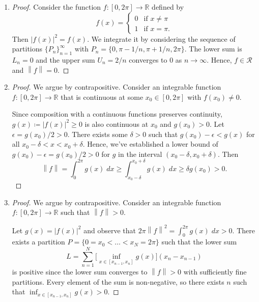 \documentclass[oneside]{article}
\newcommand\abs[1]{\left|#1\right|}
\newcommand\norm[1]{\left\|#1\right\|}
\newcommand\bbR{\mathbb{R}}
\newcommand\calR{\mathcal{R}}
\begin{document}
  \begin{enumerate}[label=(\alph*)]
    \item
      \begin{proof}
        Consider the function $f : [0, 2\pi] \to \bbR$ defined by \[
            f(x) = \begin{cases}
              0 &\text{if }x \neq \pi \\
              1 &\text{if }x = \pi \text{.}
            \end{cases}
        \] Then $\abs{f(x)}^2 = f(x)$. We integrate it by considering the sequence of partitions $\{P_n\}_{n=1}^\infty$ with $P_n = \{0, \pi - 1/n, \pi + 1/n, 2\pi\}$. The lower sum is $L_n = 0$ and the upper sum $U_n = 2/n$ converges to $0$ as $n\to\infty$. Hence, $f \in \calR$ and $\norm{f} = 0$.
      \end{proof}

    \item
      \begin{proof}
        We argue by contrapositive. Consider an integrable function $f : [0, 2\pi] \to \bbR$ that is continuous at some $x_0 \in [0, 2\pi]$ with $f(x_0) \neq 0$.

        Since composition with a continuous functions preserves continuity, $g(x) \coloneqq \abs{f(x)}^2 \geq 0$ is also continuous at $x_0$ and $g(x_0) > 0$. Let $\epsilon = g(x_0) / 2 > 0$. There exists some $\delta > 0$ such that $g(x_0) - \epsilon < g(x)$ for all $x_0 - \delta < x < x_0 + \delta$. Hence, we've established a lower bound of $g(x_0) - \epsilon = g(x_0) / 2 > 0$ for $g$ in the interval $(x_0 - \delta, x_0 + \delta)$. Then \[
          \norm{f}
          = \int_0^{2\pi} g(x)\; dx
          \geq \int_{x_0 - \delta}^{x_0 + \delta} g(x)\; dx
          \geq \delta g(x_0)
          > 0 \text{.}
        \]
      \end{proof}

    \item
      \begin{proof}
        We argue by contrapositive. Consider an integrable function $f : [0, 2\pi] \to \bbR$ such that $\norm{f} > 0$.

        Let $g(x) = \abs{f(x)}^2$ and observe that $2\pi\norm{f}^2 = \int_0^{2\pi}g(x)\;dx > 0$. There exists a partition $P = \{0 = x_0 < \dots < x_N = 2\pi\}$ such that the lower sum \[
          L = \sum_{n=1}^N \big[ \inf_{x \in [x_{n-1}, x_n]} g(x) \big] (x_n - x_{n-1})
        \] is positive since the lower sum converges to $\norm{f} > 0$ with sufficiently fine partitions. Every element of the sum is non-negative, so there exists $n$ such that $\inf_{x \in [x_{n-1}, x_n]} g(x) > 0$.


\end{proof}
\end{enumerate}
\end{document}

